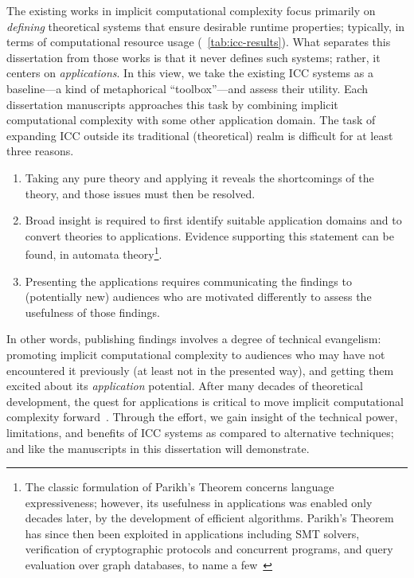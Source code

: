 The existing works in implicit computational complexity focus primarily on \emph{defining} theoretical systems that ensure desirable runtime properties;
typically, in terms of computational resource usage (\cf~\autoref{tab:icc-results}).
What separates this dissertation from those works is that it never defines such systems;
rather, it centers on \emph{applications}.
In this view, we take the existing ICC systems as a baseline---a kind of metaphorical \enquote{toolbox}---and assess their utility.
Each dissertation manuscripts approaches this task by combining implicit computational complexity with some other application domain.
The task of expanding ICC outside its traditional (theoretical) realm is difficult for at least three reasons.

\begin{enumerate}

\item Taking any pure theory and applying it reveals the shortcomings of the theory, and those issues must then be resolved.

\item Broad insight is required to first identify suitable application domains and to convert theories to applications.
Evidence supporting this statement can be found, \eg in automata theory\footnote{
The classic formulation of Parikh's Theorem concerns language expressiveness;
however, its usefulness in applications was enabled {only decades later}, by the development of efficient algorithms.
Parikh's Theorem has since then been exploited in applications including SMT solvers, verification of cryptographic protocols and concurrent programs, and query evaluation over graph databases, to name a few~\cite[pg. 2]{hague2024}}.

\item Presenting the applications requires communicating the findings to (potentially new) audiences who are motivated differently to assess the {usefulness} of those findings.
\end{enumerate}

In other words, publishing findings involves a degree of technical evangelism: promoting implicit computational complexity to audiences who may have not encountered it previously (at least not in the presented way), and getting them excited about its \emph{application} potential.
After many decades of theoretical development, the quest for applications is critical to move implicit computational complexity forward~\cite[p.~7]{moyen2017}.
Through the effort, we gain insight of the technical power, limitations, and benefits of ICC systems as compared to alternative techniques; and like the manuscripts in this dissertation will demonstrate.

